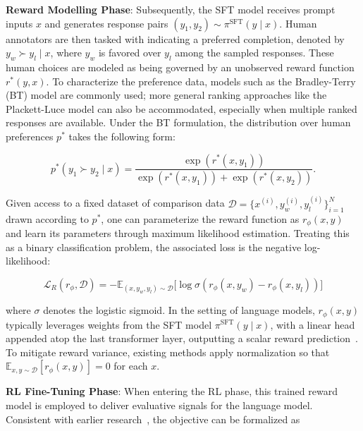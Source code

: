 \textbf{Reward Modelling Phase}: Subsequently, the SFT model receives prompt inputs $x$ and generates response pairs $(y_1, y_2)\sim \pi^\text{SFT}(y \mid x)$. Human annotators are then tasked with indicating a preferred completion, denoted by $y_w\succ y_l \mid x$, where $y_w$ is favored over $y_l$ among the sampled responses. These human choices are modeled as being governed by an unobserved reward function $r^*(y, x)$. To characterize the preference data, models such as the Bradley-Terry (BT) model \cite{bradley1952rankanalysis} are commonly used; more general ranking approaches like the Plackett-Luce model \citep{plackett1975analysis, luce2012individual} can also be accommodated, especially when multiple ranked responses are available. Under the BT formulation, the distribution over human preferences $p^*$ takes the following form:

\begin{equation}\label{eq:bradley-terry}
    p^*(y_1\succ y_2 \mid x)=\frac{\exp\left(r^*(x, y_1)\right)}{\exp\left(r^*(x, y_1)\right) + \exp\left(r^*(x, y_2)\right)}.
\end{equation}

Given access to a fixed dataset of comparison data $\mathcal{D} = \bigl\{x^{(i)}, y_w^{(i)}, y_l^{(i)}\bigr\}_{i=1}^N$ drawn according to $p^*$, one can parameterize the reward function as $r_\phi(x, y)$ and learn its parameters through maximum likelihood estimation. Treating this as a binary classification problem, the associated loss is the negative log-likelihood:

\begin{equation}\label{eq:reward_model}
    \mathcal{L}_R(r_{\phi}, \mathcal{D}) = -\mathbb{E}_{(x, y_w, y_l)\sim \mathcal{D}}\bigl[\log \sigma(r_{\phi}(x, y_w)- r_{\phi}(x, y_l))\bigr]
\end{equation}

where $\sigma$ denotes the logistic sigmoid. In the setting of language models, $r_\phi(x, y)$ typically leverages weights from the SFT model $\pi^\text{SFT}(y \mid x)$, with a linear head appended atop the last transformer layer, outputting a scalar reward prediction~\cite{ziegler2020finetuning}. To mitigate reward variance, existing methods apply normalization so that $\mathbb{E}_{x,y\sim \mathcal{D}}\left[r_\phi(x, y)\right] = 0$ for each $x$.

\textbf{RL Fine-Tuning Phase}: When entering the RL phase, this trained reward model is employed to deliver evaluative signals for the language model. Consistent with earlier research~\citep{jaques2017sequence, jaques2020human}, the objective can be formalized as

